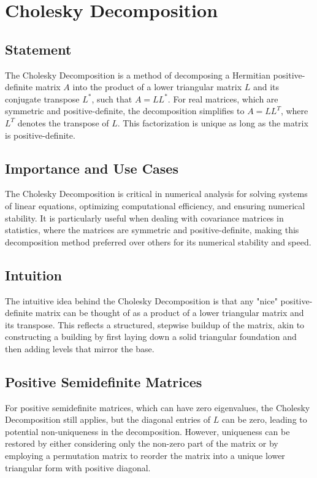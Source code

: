 \documentclass{article}
\begin{document}
\section{Cholesky Decomposition}

\subsection{Statement}
The Cholesky Decomposition is a method of decomposing a Hermitian positive-definite matrix \( A \) into the product of a lower triangular matrix \( L \) and its conjugate transpose \( L^* \), such that \( A = LL^* \). For real matrices, which are symmetric and positive-definite, the decomposition simplifies to \( A = LL^T \), where \( L^T \) denotes the transpose of \( L \). This factorization is unique as long as the matrix is positive-definite.

\subsection{Importance and Use Cases}
The Cholesky Decomposition is critical in numerical analysis for solving systems of linear equations, optimizing computational efficiency, and ensuring numerical stability. It is particularly useful when dealing with covariance matrices in statistics, where the matrices are symmetric and positive-definite, making this decomposition method preferred over others for its numerical stability and speed.

\subsection{Intuition}
The intuitive idea behind the Cholesky Decomposition is that any "nice" positive-definite matrix can be thought of as a product of a lower triangular matrix and its transpose. This reflects a structured, stepwise buildup of the matrix, akin to constructing a building by first laying down a solid triangular foundation and then adding levels that mirror the base.

\subsection{Positive Semidefinite Matrices}
For positive semidefinite matrices, which can have zero eigenvalues, the Cholesky Decomposition still applies, but the diagonal entries of \( L \) can be zero, leading to potential non-uniqueness in the decomposition. However, uniqueness can be restored by either considering only the non-zero part of the matrix or by employing a permutation matrix to reorder the matrix into a unique lower triangular form with positive diagonal.
\end{document}
